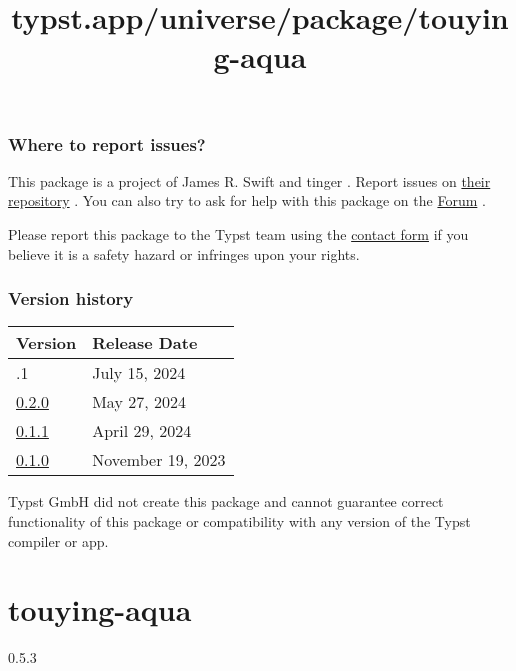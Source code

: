 \subsubsection{Where to report issues?}\label{where-to-report-issues}

This package is a project of James R. Swift and tinger . Report issues
on \href{https://github.com/typst-community/valkyrie}{their repository}
. You can also try to ask for help with this package on the
\href{https://forum.typst.app}{Forum} .

Please report this package to the Typst team using the
\href{https://typst.app/contact}{contact form} if you believe it is a
safety hazard or infringes upon your rights.

\label{versions}
\subsubsection{Version history}\label{version-history}

\begin{longtable}[]{@{}ll@{}}
\toprule\noalign{}
Version & Release Date \\
\midrule\noalign{}
\endhead
\bottomrule\noalign{}
\endlastfoot
0.2.1 & July 15, 2024 \\
\href{https://typst.app/universe/package/valkyrie/0.2.0/}{0.2.0} & May
27, 2024 \\
\href{https://typst.app/universe/package/valkyrie/0.1.1/}{0.1.1} & April
29, 2024 \\
\href{https://typst.app/universe/package/valkyrie/0.1.0/}{0.1.0} &
November 19, 2023 \\
\end{longtable}

Typst GmbH did not create this package and cannot guarantee correct
functionality of this package or compatibility with any version of the
Typst compiler or app.


\title{typst.app/universe/package/touying-aqua}

\label{banner}
\label{template-thumbnail}

\section{touying-aqua}\label{touying-aqua}

{ 0.5.3 }

